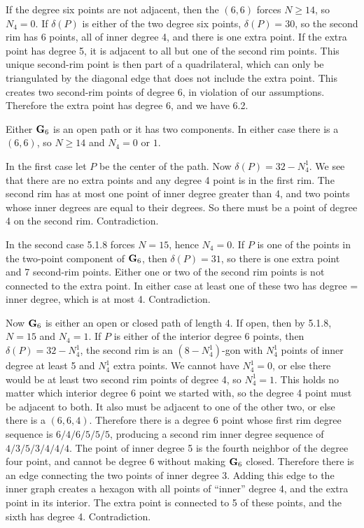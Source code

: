  
If the degree six points are not adjacent, then the $(6,6)$
forces $N\geq 14$, so $N_4 = 0$.  If $\delta(P)$ is either
of the two degree six points, $\delta(P) = 30$, so the
second rim has 6 points, all of inner degree 4, and there is
one extra point. If the extra point has degree 5, it is
adjacent to all but one of the second rim points. This
unique second-rim point is then part of a quadrilateral,
which can only be triangulated by the diagonal edge that
does not include the extra point. This creates two
second-rim points of degree 6, in violation of our
assumptions. Therefore the extra point has degree 6, and
we have 6.2.
 
 Either $\bold G_6$ is an open
path or it has two components. In either case there is a
$(6,6)$, so $N\geq 14$ and $N_4=0$ or $1$.
 
In the first case let $P$ be the center of the path. Now
$\delta(P) = 32 -N^1_4$. We see that there are no extra
points and any degree 4 point is in the first rim. The
second rim has at most one point of inner degree greater than
4, and two points whose inner degrees are equal to their
degrees. So there must be a point of degree 4 on the second
rim. Contradiction.
 
In the second case 5.1.8 forces $N=15$, hence $N_4=0$.
If $P$ is one of the points in the two-point component of
$\bold G_6$, then $\delta(P)=31$, so there is one extra
point and 7 second-rim points. Either one or two of the
second rim points is not connected to the extra point. In
either case at least one of these two has degree = inner
degree, which is at most 4. Contradiction.
 
 Now $\bold G_6$ is either an
open or closed path of length 4. If open, then by 5.1.8,
$N=15$ and $N_4=1$. If $P$ is either of the interior
degree 6 points, then $\delta(P)=32 - N_4^1$, the second
rim is an $(8-N^1_4)$-gon with $N_4^1$ points of
inner degree at least 5 and $N_4^1$ extra points. We
cannot have $N_4^1=0$, or else there would be at least two
second rim points of degree 4, so $N_4^1 = 1$. This
holds no matter which interior degree 6 point we started
with, so the degree 4 point must be adjacent to both. It also
must be adjacent to one of the other two, or else there is a
$(6,6,4)$.  Therefore there is a degree 6 point whose
first rim degree sequence is $6/4/6/5/5/5$, producing a
second rim inner degree sequence of $4/3/5/3/4/4/4$.
The point of inner degree 5 is the fourth neighbor of the
degree four point, and cannot be degree 6 without making
$\bold G_6$ closed. Therefore there is an edge connecting
the two points of inner degree 3. Adding this edge
to the inner graph creates a hexagon with all points of
``inner'' degree 4, and the extra point in its interior. The
extra point is connected to 5 of these points, and the sixth
has degree 4. Contradiction.
 
